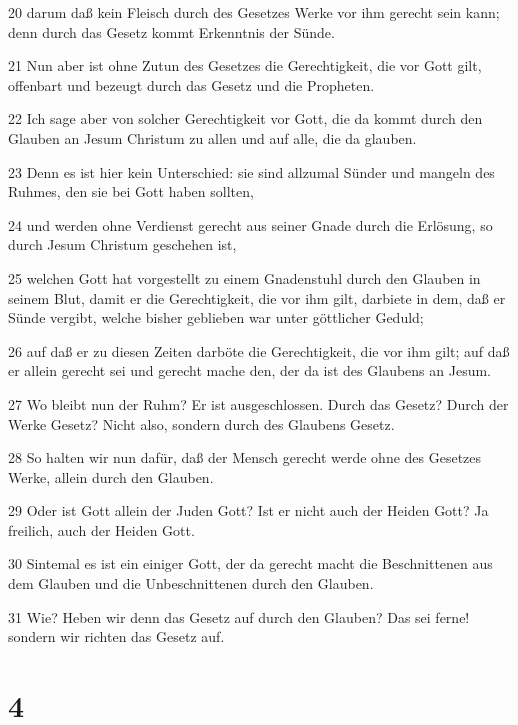 \par 20 darum daß kein Fleisch durch des Gesetzes Werke vor ihm gerecht sein kann; denn durch das Gesetz kommt Erkenntnis der Sünde.
\par 21 Nun aber ist ohne Zutun des Gesetzes die Gerechtigkeit, die vor Gott gilt, offenbart und bezeugt durch das Gesetz und die Propheten.
\par 22 Ich sage aber von solcher Gerechtigkeit vor Gott, die da kommt durch den Glauben an Jesum Christum zu allen und auf alle, die da glauben.
\par 23 Denn es ist hier kein Unterschied: sie sind allzumal Sünder und mangeln des Ruhmes, den sie bei Gott haben sollten,
\par 24 und werden ohne Verdienst gerecht aus seiner Gnade durch die Erlösung, so durch Jesum Christum geschehen ist,
\par 25 welchen Gott hat vorgestellt zu einem Gnadenstuhl durch den Glauben in seinem Blut, damit er die Gerechtigkeit, die vor ihm gilt, darbiete in dem, daß er Sünde vergibt, welche bisher geblieben war unter göttlicher Geduld;
\par 26 auf daß er zu diesen Zeiten darböte die Gerechtigkeit, die vor ihm gilt; auf daß er allein gerecht sei und gerecht mache den, der da ist des Glaubens an Jesum.
\par 27 Wo bleibt nun der Ruhm? Er ist ausgeschlossen. Durch das Gesetz? Durch der Werke Gesetz? Nicht also, sondern durch des Glaubens Gesetz.
\par 28 So halten wir nun dafür, daß der Mensch gerecht werde ohne des Gesetzes Werke, allein durch den Glauben.
\par 29 Oder ist Gott allein der Juden Gott? Ist er nicht auch der Heiden Gott? Ja freilich, auch der Heiden Gott.
\par 30 Sintemal es ist ein einiger Gott, der da gerecht macht die Beschnittenen aus dem Glauben und die Unbeschnittenen durch den Glauben.
\par 31 Wie? Heben wir denn das Gesetz auf durch den Glauben? Das sei ferne! sondern wir richten das Gesetz auf.

\chapter{4}

